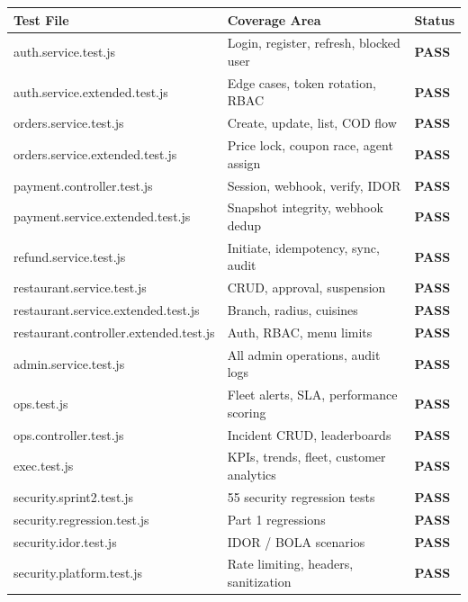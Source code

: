 \documentclass[11pt,a4paper]{article}
\newcommand{\PASS}{\colorbox{successgreen!20}{\color{successgreen}\bfseries\small PASS}}
\begin{document}
\begin{tabularx}{\textwidth}{@{}lXl@{}}
\toprule
\rowcolor{navyblue}\color{white}\bfseries Test File & \color{white}\bfseries Coverage Area & \color{white}\bfseries Status \\
\midrule
auth.service.test.js           & Login, register, refresh, blocked user   & \PASS \\
\rowcolor{rowalt}
auth.service.extended.test.js  & Edge cases, token rotation, RBAC         & \PASS \\
orders.service.test.js         & Create, update, list, COD flow           & \PASS \\
\rowcolor{rowalt}
orders.service.extended.test.js & Price lock, coupon race, agent assign   & \PASS \\
payment.controller.test.js     & Session, webhook, verify, IDOR           & \PASS \\
\rowcolor{rowalt}
payment.service.extended.test.js & Snapshot integrity, webhook dedup      & \PASS \\
refund.service.test.js         & Initiate, idempotency, sync, audit       & \PASS \\
\rowcolor{rowalt}
restaurant.service.test.js     & CRUD, approval, suspension               & \PASS \\
restaurant.service.extended.test.js & Branch, radius, cuisines           & \PASS \\
\rowcolor{rowalt}
restaurant.controller.extended.test.js & Auth, RBAC, menu limits         & \PASS \\
admin.service.test.js          & All admin operations, audit logs         & \PASS \\
\rowcolor{rowalt}
ops.test.js                    & Fleet alerts, SLA, performance scoring   & \PASS \\
ops.controller.test.js         & Incident CRUD, leaderboards              & \PASS \\
\rowcolor{rowalt}
exec.test.js                   & KPIs, trends, fleet, customer analytics  & \PASS \\
security.sprint2.test.js       & 55 security regression tests             & \PASS \\
\rowcolor{rowalt}
security.regression.test.js    & Part 1 regressions                       & \PASS \\
security.idor.test.js          & IDOR / BOLA scenarios                    & \PASS \\
\rowcolor{rowalt}
security.platform.test.js      & Rate limiting, headers, sanitization     & \PASS \\

\end{tabularx}
\end{document}
